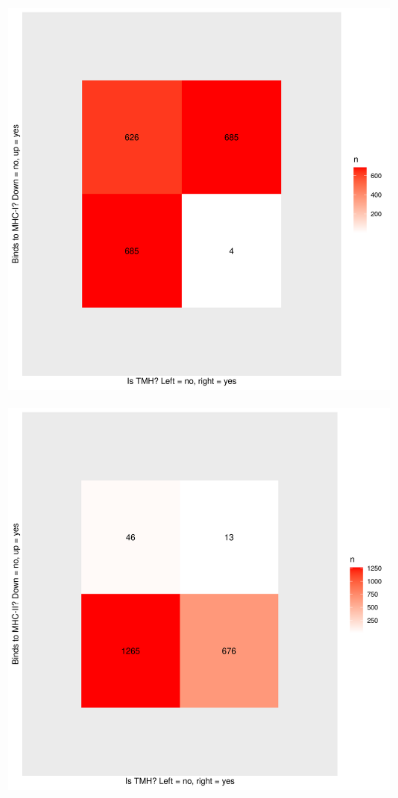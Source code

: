 \begin{figure}[!htbp]
  \includegraphics[width=0.9\textwidth]{p_bind_per_hydrophobicity/is_tmh_vs_binds_mhc1.png}
  \caption{
  }
  \label{fig:is_tmh_vs_binds_mhc1}
\end{figure}

\begin{figure}[!htbp]
  \includegraphics[width=0.9\textwidth]{p_bind_per_hydrophobicity/is_tmh_vs_binds_mhc2.png}
  \caption{
  }
  \label{fig:is_tmh_vs_binds_mhc2}
\end{figure}


